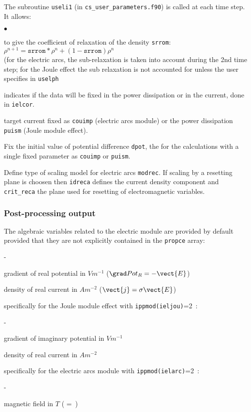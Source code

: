 {{The subroutine \texttt{useli1} (in \texttt{cs\_user\_parameters.f90})
 is called at each time step. It allows:
\begin{list}{$\bullet$}{}
\item to give the coefficient of relaxation of the density \texttt{srrom}:\\
$\rho^{n+1}=\texttt{srrom}*\rho^{n}+(1-\texttt{srrom})\rho^{n}$\\
(for the electric arcs, the sub-relaxation is taken into account during the 2nd time
 step; for the Joule effect the sub relaxation is not accounted for unless the user
 specifies in \texttt{uselph}

\item indicates if the data will be fixed in the power dissipation or
 in the current, done in \texttt{ielcor}.
\item target current fixed as \texttt{couimp} (electric arcs module)
 or the power dissipation \texttt{puism} (Joule module effect).
\item Fix the initial value of potential difference \texttt{dpot},
 the for the calculations with a single fixed parameter as \texttt{couimp}
 or \texttt{puism}.
\item Define type of scaling model for electric arcs \texttt{modrec}. If scaling
by a resetting plane is choosen then \texttt{idreca} defines the current density component
and \texttt{crit\_reca} the plane used for resetting of electromagnetic variables.
\end{list}

\subsubsection[{\em EnSight} output]
{Post-processing output}

The algebraic variables related to the electric module are provided by default provided
 that they are not explicitly contained in the \texttt{propce} array:
\begin{list}{-}{}
\item gradient of real potential in $V m^{-1}$ ($\grad Pot_R = -\vect{E}$)
\item density of real current in $A m^{-2}$  ($\vect{j}=\sigma \vect{E}$)
\end{list}
specifically for the Joule module effect with \texttt{ippmod(ieljou)}=2~:
\begin{list}{-}{}
\item gradient of imaginary potential in $V m^{-1}$
\item density of real current in $A m^{-2}$
\end{list}
specifically for the electric arcs module with \texttt{ippmod(ielarc)}=2~:
\begin{list}{-}{}
\item magnetic field in $T$ ( = \,)
\end{list}

}}
